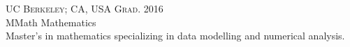 {\small\raggedright
    {
        \textsc{
            UC Berkeley; CA, USA
            \hfill
            {\raggedleft
                Grad. 2016
            }
        }
    } \\

    \large{
        MMath Mathematics
    } \\
    \normalsize{
        Master's in mathematics specializing in data modelling and numerical analysis.
    } \\
}
